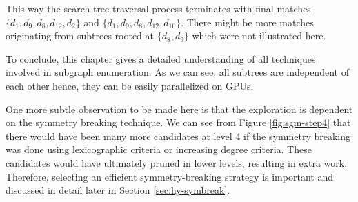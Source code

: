 This way the search tree traversal process terminates with final matches
$\{d_1, d_9, d_8, d_{12}, d_2\}$ and $\{d_1, d_9, d_8, d_{12}, d_{10}\}$.
There might be more matches originating from subtrees rooted at $\{d_8, d_9\}$ which were not illustrated here.

To conclude, this chapter gives a detailed understanding of all techniques involved in subgraph enumeration. As we can see, all subtrees are independent of each other hence, they can be easily parallelized on GPUs.

One more subtle observation to be made here is that the exploration is dependent on the symmetry breaking technique.
We can see from Figure \ref{fig:sgm-step4} that there would have been many more candidates at level 4 if the symmetry breaking was done using lexicographic criteria or increasing degree criteria.
These candidates would have ultimately pruned in lower levels, resulting in extra work.
Therefore, selecting an efficient symmetry-breaking strategy is important and discussed in detail later in Section \ref{sec:hy-symbreak}.
